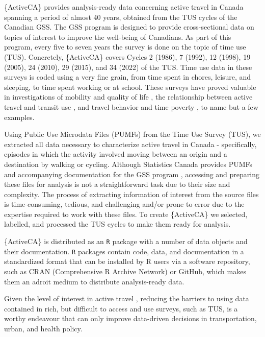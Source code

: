 \documentclass[Royal,times,sageh]{sagej}
\begin{document}
\{ActiveCA\} provides analysis-ready data concerning active travel in
Canada spanning a period of almost 40 years, obtained from the TUS
cycles of the Canadian GSS. The GSS program is designed to provide
cross-sectional data on topics of interest to improve the well-being of
Canadians. As part of this program, every five to seven years the survey
is done on the topic of time use (TUS). Concretely, \{ActiveCA\} covers
Cycles 2 (1986), 7 (1992), 12 (1998), 19 (2005), 24 (2010), 29 (2015),
and 34 (2022) of the TUS. Time use data in these surveys is coded using
a very fine grain, from time spent in chores, leisure, and sleeping, to
time spent working or at school. These surveys have proved valuable in
investigations of mobility and quality of life
\citep{spinneyTransport2009}, the relationship between active travel and
transit use \citep{lachapelleLonger2016}, and travel behavior and time
poverty \citep{kimFacing2024}, to name but a few examples.

Using Public Use Microdata Files (PUMFs) from the Time Use Survey (TUS),
we extracted all data necessary to characterize active travel in Canada
- specifically, episodes in which the activity involved moving between
an origin and a destination by walking or cycling. Although Statistics
Canada provides PUMFs and accompanying documentation for the GSS program
\citep[see][]{statisticscanada2024}, accessing and preparing these files
for analysis is not a straightforward task due to their size and
complexity. The process of extracting information of interest from the
source files is time-consuming, tedious, and challenging and/or prone to
error due to the expertise required to work with these files. To create
\{ActiveCA\} we selected, labelled, and processed the TUS cycles to make
them ready for analysis.

\{ActiveCA\} is distributed as an \texttt{R} package with a number of
data objects and their documentation. \texttt{R} packages contain code,
data, and documentation in a standardized format that can be installed
by R users via a software repository, such as CRAN (Comprehensive R
Archive Network) or GitHub, which makes them an adroit medium to
distribute analysis-ready data.

Given the level of interest in active travel
\citep[e.g.,][]{mccurdySupport2023}, reducing the barriers to using data
contained in rich, but difficult to access and use surveys, such as TUS,
is a worthy endeavour that can only improve data-driven decisions in
transportation, urban, and health policy.
\end{document}
